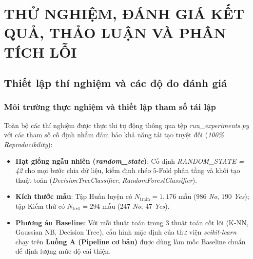 \chapter[THỬ NGHIỆM, ĐÁNH GIÁ KẾT QUẢ, THẢO LUẬN VÀ PHÂN TÍCH LỖI]{THỬ NGHIỆM, ĐÁNH GIÁ KẾT QUẢ, THẢO LUẬN VÀ PHÂN TÍCH LỖI}

\section{Thiết lập thí nghiệm và các độ đo đánh giá}

\subsection{Môi trường thực nghiệm và thiết lập tham số tái lập}
Toàn bộ các thí nghiệm được thực thi tự động thông qua tệp \textit{run\_experiments.py} với các tham số cố định nhằm đảm bảo khả năng tái tạo tuyệt đối (\textit{100\% Reproducibility}):
\begin{itemize}
    \item \textbf{Hạt giống ngẫu nhiên (\textit{random\_state})}: Cố định \textit{RANDOM\_STATE = 42} cho mọi bước chia dữ liệu, kiểm định chéo $5$-Fold phân tầng và khởi tạo thuật toán (\textit{DecisionTreeClassifier}, \textit{RandomForestClassifier}).
    \item \textbf{Kích thước mẫu}: Tập Huấn luyện có $N_{\text{train}} = 1,176$ mẫu ($986$ \textit{No}, $190$ \textit{Yes}); tập Kiểm thử có $N_{\text{test}} = 294$ mẫu ($247$ \textit{No}, $47$ \textit{Yes}).
    \item \textbf{Phương án Baseline}: Với mỗi thuật toán trong $3$ thuật toán cốt lõi (K-NN, Gaussian NB, Decision Tree), cấu hình mặc định của thư viện \textit{scikit-learn} chạy trên \textbf{Luồng A (Pipeline cơ bản)} được dùng làm mốc Baseline chuẩn để định lượng mức độ cải thiện.
\end{itemize}

